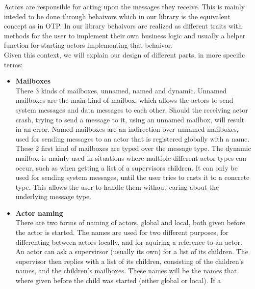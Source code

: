 \documentclass[a4paper]{article}
\begin{document}
\noindent
Actors are responsible for acting upon the messages they receive. This is mainly
inteded to be done through behaivors which in our library is the equivalent
concept as in OTP. In our library behaivors are realized as different traits
with methods for the user to implement their own business logic and usually a
helper function for starting actors implementing that behaivor.\\

\noindent
Given this context, we will explain our design of different parts, in more
specific terms:
\begin{itemize}
\item \textbf{Mailboxes}\\
  There 3 kinds of mailboxes, unnamed, named and dynamic. Unnamed mailboxes are
  the main kind of mailbox, which allows the actors to send system messages and
  data messages to each other. Should the receiving actor crash, trying to send
  a message to it, using an unnamed mailbox, will result in an error. Named
  mailboxes are an indirection over unnamed mailboxes, used for sending messages
  to an actor that is registered globally with a name. These 2 first kind of
  mailboxes are typed over the message type. The dynamic mailbox is mainly used
  in situations where multiple different actor types can occur, such as when
  getting a list of a supervisors children. It can only be used for sending
  system messages, until the user tries to casts it to a concrete type. This
  allows the user to handle them without caring about the underlying message
  type.
\item \textbf{Actor naming}\\
  There are two forms of naming of actors, global and local, both given before
  the actor is started. The names are used for two different purposes, for
  differenting between actors locally, and for aquiring a reference to an actor.
  An actor can ask a supervirsor (usually its own) for a list of its children.
  The supervisor then replies with a list of its children, consisting of the
  children's names, and the children's mailboxes. These names will be the names
  that where given before the child was started (either global or local). If a

\end{itemize}
\end{document}
